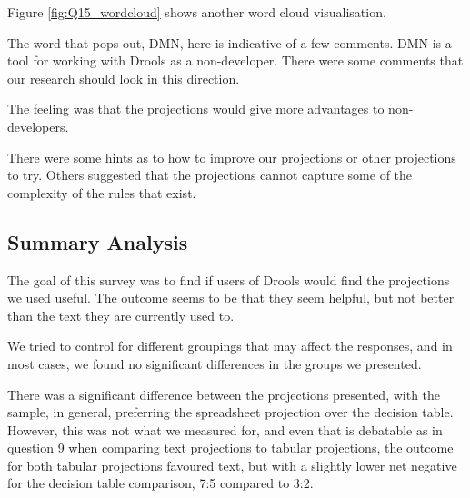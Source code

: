 Figure \ref{fig:Q15_wordcloud} shows another word cloud visualisation.

The word that pops out, DMN, here is indicative of a few comments.
DMN is a tool for working with Drools as a non-developer.
There were some comments that our research should look in this direction.

The feeling was that the projections would give more advantages to non-developers.

There were some hints as to how to improve our projections or other projections to try.
Others suggested that the projections cannot capture some of the complexity of the rules that exist.

\subsection{Summary Analysis}

The goal of this survey was to find if users of Drools would find the projections we used useful.
The outcome seems to be that they seem helpful, but not better than the text they are currently used to.

We tried to control for different groupings that may affect the responses, and in most cases, we found no significant differences in the groups we presented.

There was a significant difference between the projections presented, with the sample, in general, preferring the spreadsheet projection over the decision table. 
However, this was not what we measured for, and even that is debatable as in question 9 when comparing text projections to tabular projections, the outcome for both tabular projections favoured text, but with a slightly lower net negative for the decision table comparison, 7:5 compared to 3:2.
